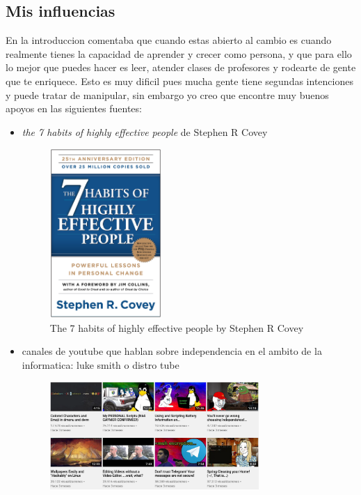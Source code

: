 \subsection{Mis influencias}
En la introduccion comentaba que cuando estas abierto al cambio es cuando realmente tienes la capacidad de aprender y crecer como persona, y que para ello lo mejor que puedes hacer es leer, atender clases de profesores y rodearte de gente que te enriquece. Esto es muy dificil pues mucha gente tiene segundas intenciones y puede tratar de manipular, sin embargo yo creo que encontre muy buenos apoyos en las siguientes fuentes:
\begin{itemize}
	\item{ \textit{the 7 habits of highly effective people} de Stephen R Covey 
		\begin{figure}[h]
			\centering
			\includegraphics[width=0.4\textwidth]{figures/the7habits.jpg}
			\caption{The 7 habits of highly effective people by Stephen R Covey}
		\end{figure}
	}
\item{ canales de youtube que hablan sobre independencia en el ambito de la informatica: luke smith o distro tube
		\begin{figure}[H]
			\centering
			\includegraphics[width=0.75\textwidth]{figures/luke-smith.png}

\end{figure}}
\end{itemize}

